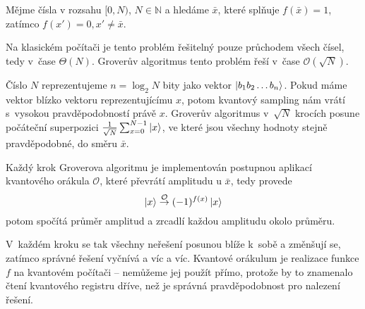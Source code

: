 Mějme čísla v rozsahu $[0, N)$, $N \in \mathbb{N}$ a hledáme
$\bar x$, které splňuje $f(\bar x) = 1$, zatímco $f(x') = 0, x' \neq
\bar x$.

Na klasickém počítači je tento problém řešitelný pouze průchodem všech
čísel, tedy v~čase $\Theta(N)$.
Groverův algoritmus tento problém řeší v~čase $\mathcal{O}(\sqrt{N})$.

Číslo $N$ reprezentujeme $n = \log_2 N$ bity jako vektor
$\ket{b_1 b_2 \ldots b_n}$. Pokud máme vektor blízko vektoru
reprezentujícímu $x$, potom kvantový sampling nám vrátí s~vysokou
pravděpodobností právě $x$. Groverův algoritmus v~$\sqrt{N}$ krocích
posune počáteční superpozici $\frac{1}{\sqrt{N}} \sum_{x = 0}^{N-1}
\ket{x}$, ve které jsou všechny hodnoty stejně pravděpodobné,
do směru $\bar x$.

Každý krok Groverova algoritmu je implementován postupnou aplikací
kvantového orákula $\mathcal{O}$, které převrátí amplitudu u $\bar x$,
tedy provede
\[
    \ket{x} \stackrel{\mathcal{O}}{\to} (-1)^{f(x)} \ket{x}
\]
potom spočítá průměr amplitud a zrcadlí každou amplitudu okolo průměru.

V~každém kroku se tak všechny neřešení posunou blíže k~sobě a změnšují
se, zatímco správné řešení vyčnívá a víc a víc. Kvantové orákulum je
realizace funkce $f$ na kvantovém počítači -- nemůžeme jej použít přímo,
protože by to znamenalo čtení kvantového registru dříve, než je správná
pravděpodobnost pro nalezení řešení.

